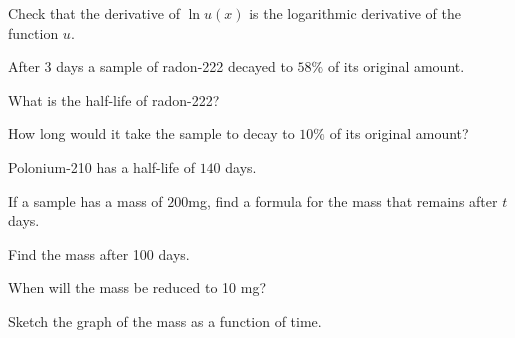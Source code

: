 \begin{multicols}{2}
\subprob  Check that the derivative of $\ln u(x)$ is the logarithmic
derivative of the function $u$.












\problem After $3$ days a sample of radon-222 decayed to $58\%$ of its original %
amount.

\subprob What is the half-life of radon-222?

\subprob How long would it take the sample to decay to $10\%$ of its
original amount?

\problem   Polonium-210 has a half-life of $140$ days. %

\subprob If a sample has a mass of $200$mg, find a formula for the
mass that remains after $t$ days.

\subprob Find the mass after 100 days.

\subprob When will the mass be reduced to 10 mg?

\subprob Sketch the graph of the mass as a function of time.





























\end{multicols}

